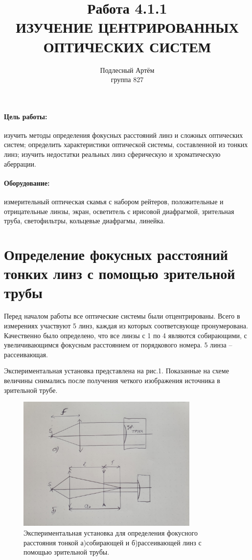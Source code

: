 \documentclass[a4paper, 14pt]{extarticle}%
\author{Подлесный Артём \\ группа 827}
\title{Работа 4.1.1 \\ ИЗУЧЕНИЕ ЦЕНТРИРОВАННЫХ
ОПТИЧЕСКИХ СИСТЕМ}
\newcommand\ECaption[1]{%
     \captionsetup{font=footnotesize}%
     \caption{#1}}
\begin{document}
\maketitle

\paragraph*{Цель работы:} изучить методы определения фокусных расстояний линз и сложных
оптических систем; определить характеристики оптической системы, составленной из
тонких линз; изучить недостатки реальных линз сферическую и хроматическую аберрации.
\paragraph*{Оборудование:} измерительный оптическая скамья с набором рейтеров, положительные и отрицательные линзы, экран, осветитель с ирисовой диафрагмой, зрительная труба, светофильтры, кольцевые диафрагмы, линейка.

\section{Определение фокусных расстояний тонких линз с помощью
зрительной трубы}

Перед началом работы все оптические системы были отцентрированы. Всего в измерениях участвуют 5 линз, каждая из которых соответсвующе пронумерована. Качественно было определено, что все линзы с 1 по 4 являются собирающими, с увеличивающимся фокусным расстоянием от порядкового номера. 5 линза -- рассеивающая. 

Экспериментальная установка представлена на рис.1. Показанные на схеме величины снимались после получения четкого изображения источника в зрительной трубе.

\begin{figure}[h!]
\begin{center}
\includegraphics[width=0.8\textwidth]{1}
\end{center}
\ECaption{Экспериментальная установка для определения фокусного расстояния тонкой а)собирающей и б)рассеивающей линз с помощью зрительной трубы. }
\end{figure}
\end{document}
